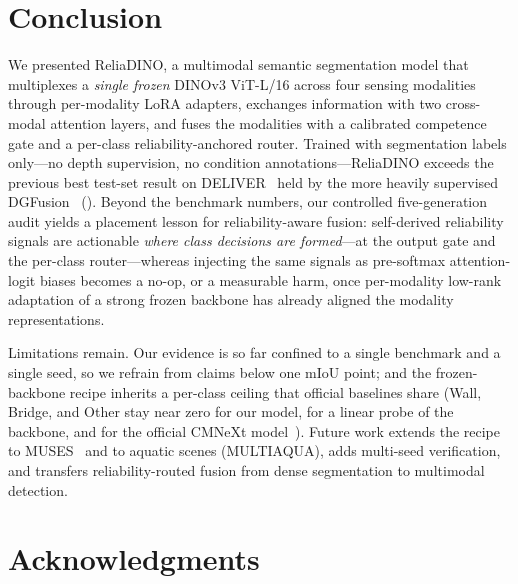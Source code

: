 
\section{Conclusion}
\label{sec:conclusion}

We presented ReliaDINO, a multimodal semantic segmentation model that
multiplexes a \emph{single frozen} DINOv3 ViT-L/16 across four sensing
modalities through per-modality LoRA adapters, exchanges information with two
cross-modal attention layers, and fuses the modalities with a calibrated
competence gate and a per-class reliability-anchored router. Trained with
segmentation labels only---no depth supervision, no condition
annotations---ReliaDINO exceeds the previous best test-set result on
DELIVER~\cite{cmnext2023} held by the more heavily supervised
DGFusion~\cite{dgfusion2026}
(). Beyond the benchmark numbers,
our controlled five-generation audit yields a placement lesson for
reliability-aware fusion: self-derived reliability signals are actionable
\emph{where class decisions are formed}---at the output gate and the
per-class router---whereas injecting the same signals as pre-softmax
attention-logit biases becomes a no-op, or a measurable harm, once
per-modality low-rank adaptation of a strong frozen backbone has already
aligned the modality representations.

Limitations remain. Our evidence is so far confined to a single benchmark
and a single seed, so we refrain from claims below one mIoU point; and the
frozen-backbone recipe inherits a per-class ceiling that official baselines
share (Wall, Bridge, and Other stay near zero for our model, for a linear
probe of the backbone, and for the official CMNeXt
model~\cite{cmnext2023}). Future work extends the recipe to
MUSES~\cite{muses2024} and to aquatic scenes (MULTIAQUA), adds multi-seed
verification, and transfers reliability-routed fusion from dense
segmentation to multimodal detection.

\section*{Acknowledgments}

